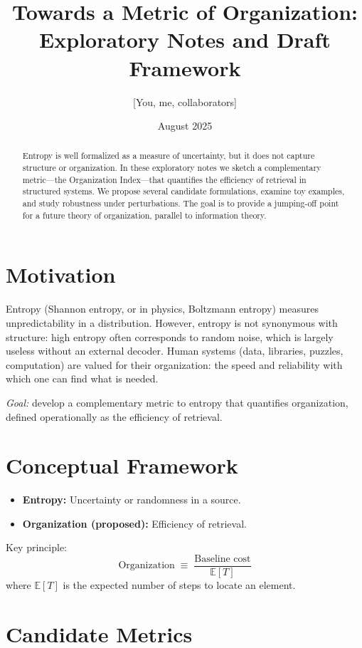 \documentclass[11pt]{article}
\title{Towards a Metric of Organization:\\
Exploratory Notes and Draft Framework}
\author{[You, me, collaborators]}
\date{August 2025}
\begin{document}
\maketitle

\begin{abstract}
Entropy is well formalized as a measure of uncertainty, but it does not capture
structure or organization. In these exploratory notes we sketch a complementary
metric---the Organization Index---that quantifies the efficiency of retrieval in
structured systems. We propose several candidate formulations, examine toy
examples, and study robustness under perturbations. The goal is to provide a
jumping-off point for a future theory of organization, parallel to information
theory.
\end{abstract}

\section{Motivation}
Entropy (Shannon entropy, or in physics, Boltzmann entropy) measures
unpredictability in a distribution. However, entropy is not synonymous with
structure: high entropy often corresponds to random noise, which is largely
useless without an external decoder. Human systems (data, libraries, puzzles,
computation) are valued for their organization: the speed and reliability with
which one can find what is needed.

\emph{Goal:} develop a complementary metric to entropy that quantifies
organization, defined operationally as the efficiency of retrieval.

\section{Conceptual Framework}
\begin{itemize}
  \item \textbf{Entropy:} Uncertainty or randomness in a source.
  \item \textbf{Organization (proposed):} Efficiency of retrieval.
\end{itemize}

\noindent
Key principle:
\[
\text{Organization} \;\equiv\; \frac{\text{Baseline cost}}{\mathbb{E}[T]}
\]
where $\mathbb{E}[T]$ is the expected number of steps to locate an element.

\section{Candidate Metrics}
\end{document}
